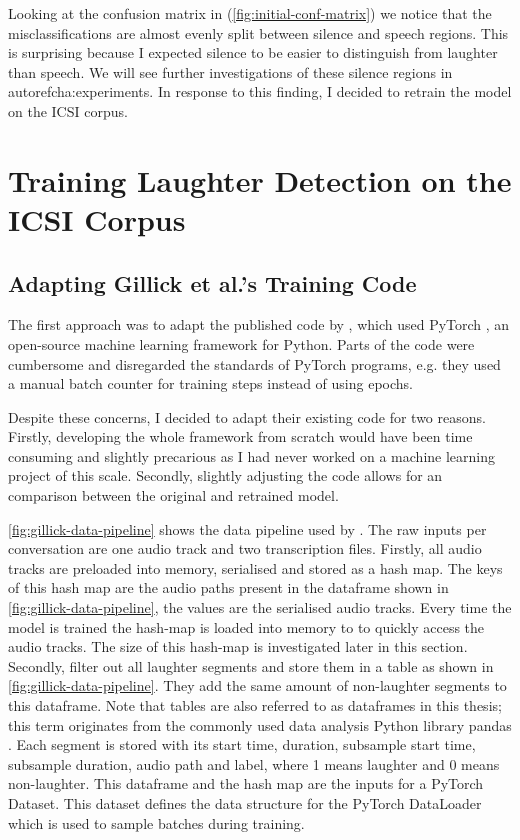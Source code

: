 \documentclass[bsc,frontabs,parskip,deptreport]{infthesis}
\begin{document}
Looking at the confusion matrix in (\autoref{fig:initial-conf-matrix}) we notice that the misclassifications are almost evenly split between silence and speech regions. This is surprising because I expected silence to be easier to distinguish from laughter than speech.
We will see further investigations of these silence regions in autoref{cha:experiments}.
In response to this finding, I decided to retrain the model on the ICSI corpus. 


\chapter{Training Laughter Detection on the ICSI Corpus} \label{cha:retraining}
\section{Adapting Gillick et al.'s Training Code} 
The first approach was to adapt the published code by \citet{gillick-codebase}, which used PyTorch \citep{pytorch2017automatic}, an open-source machine learning framework for Python.
Parts of the code were cumbersome and disregarded the standards of PyTorch programs, e.g. they used a manual batch counter for training steps instead of using epochs.  

Despite these concerns, I decided to adapt their existing code for two reasons.
Firstly, developing the whole framework from scratch would have been time consuming and slightly precarious as I had never worked on a machine learning project of this scale.
Secondly, slightly adjusting the code allows for an comparison between the original and retrained model. 

\autoref{fig:gillick-data-pipeline} shows the data pipeline used by \citet{gillick2021robust}. The raw inputs per conversation are one audio track and two transcription files. 
Firstly, all audio tracks are preloaded into memory, serialised and stored as a hash map. The keys of this hash map are the audio paths present in the dataframe shown in \autoref{fig:gillick-data-pipeline}, the values are the serialised audio tracks. Every time the model is trained the hash-map is loaded into memory to to quickly access the audio tracks. The size of this hash-map is investigated later in this section.
Secondly, \citet{gillick2021robust} filter out all laughter segments and store them in a table as shown in \autoref{fig:gillick-data-pipeline}.
They add the same amount of non-laughter segments to this dataframe. 
Note that tables are also referred to as dataframes in this thesis; this term originates from the commonly used data analysis Python library pandas \citep{jeff_reback_2021_5574486}.
Each segment is stored with its start time, duration, subsample start time, subsample duration, audio path and label, where 1 means laughter and 0 means non-laughter. 
This dataframe and the hash map are the inputs for a PyTorch Dataset. This dataset defines the data structure for the PyTorch DataLoader which is used to sample batches during training.
\end{document}
